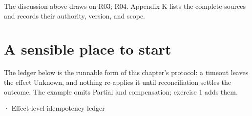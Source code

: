 The discussion above draws on R03; R04. Appendix K lists the complete sources and records their authority, version, and scope.\par

\section{A sensible place to start}

The ledger below is the runnable form of this chapter's protocol: a timeout leaves the effect Unknown, and nothing re-applies it until reconciliation settles the outcome. The example omits Partial and compensation; exercise 1 adds them.\par

\BookSnake · Effect-level idempotency ledger\par

